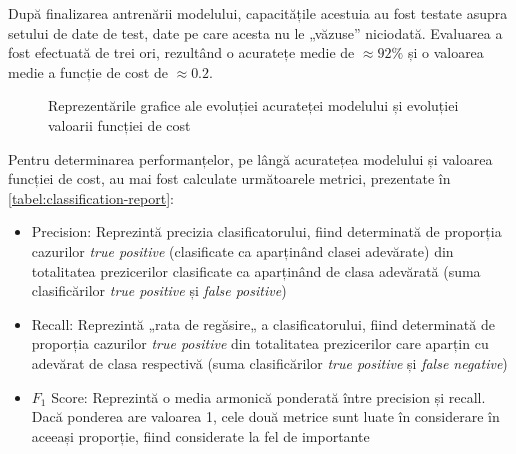 După finalizarea antrenării modelului, capacitățile acestuia au fost testate asupra setului de date de test, date pe care acesta nu le „văzuse” niciodată. Evaluarea a fost efectuată de trei ori, rezultând o acuratețe medie de $\approx92\%$ și o valoarea medie a funcție de cost de $\approx0.2$.

\begin{figure}[ht]
\centering
{}
\qquad
{}
\caption{Reprezentările grafice ale evoluției acurateței modelului \protect{} și evoluției valoarii funcției de cost \protect{}}\label{fig:acc+loss+graph}
\end{figure}

Pentru determinarea performanțelor, pe lângă acuratețea modelului și valoarea funcției de cost, au mai fost calculate următoarele metrici, prezentate în \autoref{tabel:classification-report}:
\begin{itemize}
\item Precision: Reprezintă precizia clasificatorului, fiind determinată de proporția cazurilor \textit{true positive} (clasificate ca aparținând clasei adevărate) din totalitatea prezicerilor clasificate ca aparținând de clasa adevărată (suma clasificărilor \textit{true positive} și \textit{false positive})
\item Recall: Reprezintă „rata de regăsire„ a clasificatorului, fiind determinată de proporția cazurilor \textit{true positive} din totalitatea prezicerilor care aparțin cu adevărat de clasa respectivă (suma clasificărilor \textit{true positive} și \textit{false negative})
\item $F_1$ Score: Reprezintă o media armonică ponderată între precision și recall. Dacă ponderea are valoarea 1, cele două metrice sunt luate în considerare în aceeași proporție, fiind considerate la fel de importante
\end{itemize}

